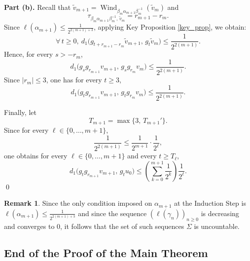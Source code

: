 \documentclass[a4paper,english,reqno]{amsart}
\theoremstyle{definition}
\newtheorem{remark}{Remark}
\numberwithin{equation}{section}
\begin{document}
\medskip
\noindent\textbf{Part (b).}
Recall that $\tilde v_{m+1}=\operatorname{Wind}_{\beta_m \alpha_{m+1}\beta_m^{-1}}(\tilde v_m)$ and
\[
\tau_{\beta_m \alpha_{m+1}\beta_m^{-1},\,\tilde v_m}=r_{m+1}-r_m.
\]
Since $\ell(\alpha_{m+1})\leq \frac{1}{2^{2(m+1)+3}}$, applying Key Proposition \ref{key_prop}, we obtain:
\[\forall \, t\geq 0,~
d_1\bigl(g_{t+r_{m+1}-r_m}\tilde v_{m+1},\, g_t\tilde v_{m}\bigr)
\le \frac{1}{2^{2(m+1)}}.
\]
Hence, for every $s>-r_m$,
\[
d_1\bigl(g_s g_{r_{m+1}} v_{m+1},\, g_s g_{r_m} v_m\bigr)
\le \frac{1}{2^{2(m+1)}}.
\]
Since $|r_m|\le 3$, one has for every $t\ge 3$,
\[
d_1\bigl(g_t g_{r_{m+1}} v_{m+1},\, g_t g_{r_m} v_m\bigr)
\le \frac{1}{2^{2(m+1)}}.
\]

\medskip
Finally, let
\[
T_{m+1}=\max\{3,\,T_{m+1}'\}.
\]
Since for every $\ell\in\{0,\dots,m+1\}$,
\[
\frac{1}{2^{2(m+1)}}\le \frac{1}{2^{m+1}}\cdot\frac{1}{2^{\ell}},
\]
one obtains for every $\ell\in\{0,\dots,m+1\}$ and every $t\ge T_\ell$,
\[
d_1\bigl(g_t g_{r_{m+1}} v_{m+1},\, g_t u_0\bigr)
\le \left(\sum_{k=0}^{m+1}\frac{1}{2^{k}}\right)\frac{1}{2^{\ell}}.
\]
\qed


\begin{remark}
Since the only condition imposed on $\alpha_{m+1}$ at the Induction Step is \\ $\ell(\alpha_{m+1})\leq \frac{1}{2^{2(m+1)+3}}$ and since the sequence $(\ell(\gamma_n))_{n\geq 0}$ is decreasing  and converges to $0$, it follows that the set of such sequences $\Sigma$ is uncountable.  

\end{remark}





\subsection{End of the Proof of the Main Theorem}\label{end_proof}
\end{document}
